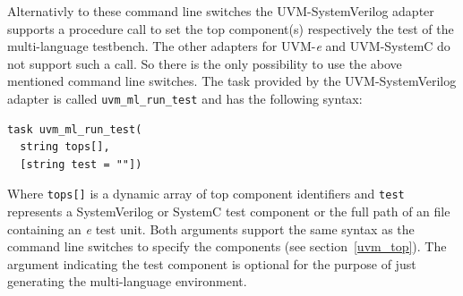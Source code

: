 Alternativly to these command line switches the UVM-SystemVerilog adapter supports a procedure call to set the top
component(s) respectively the test of the multi-language testbench. The other adapters for UVM-\textit{e} and
UVM-SystemC do not support such a call. So there is the only possibility to use the above mentioned command line
switches. The task provided by the UVM-SystemVerilog adapter is called \lstinline$uvm_ml_run_test$ and has the following
syntax:
\medskip
{}
\begin{lstlisting}
task uvm_ml_run_test(
  string tops[],
  [string test = ""])
\end{lstlisting} 
\medskip
Where \lstinline$tops[]$ is a dynamic array of top component identifiers and \lstinline$test$ represents a
SystemVerilog or SystemC test component or the full path of an file containing an \textit{e} test unit. Both arguments
support the same syntax as the command line switches to specify the components (see section~\ref{uvm_top}). The argument
indicating the test component is optional for the purpose of just generating the multi-language environment.